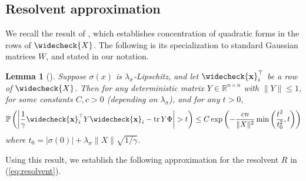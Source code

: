 \documentclass{article}
\newtheorem{lemma}[theorem]{Lemma}
\theoremstyle{definition}
\newcommand{\R}{\mathbb{R}}
\newcommand{\tr}{\operatorname{tr}}
\newcommand{\vX}{\widecheck{X}}
\renewcommand{\P}{\mathbb{P}}
\newcommand{\vx}{\widecheck{\mathbf{x}}}
\newcommand{\1}{\mathbf{1}}
\begin{document}
\subsection{Resolvent approximation}

We recall the result of \cite[Lemma 1]{louart2018random}, which
establishes concentration of quadratic forms in the rows of $\vX$.
The following is its specialization to standard Gaussian matrices $W$,
and stated in our notation.

\begin{lemma}[\cite{louart2018random}]\label{lemma:quadform}
Suppose $\sigma(x)$ is $\lambda_\sigma$-Lipschitz, and let $\vx_i^\top$ be a row
of $\vX$. Then for any deterministic
matrix $Y \in \R^{n\times n}$ with $\|Y\|\le 1$, for some constants
$C,c>0$ (depending on $\lambda_\sigma$), and for any $t>0$,
\begin{equation}\label{eq:concentration_quadratic}
\P\left(\left|\frac{1}{\gamma}\vx_i^\top Y \vx_i-\tr Y\Phi \right|>t\right)
\leq C\exp\left(-\frac{cn}{\|X\|^2}\min\left(\frac{t^2}{t_0^2},
t\right)\right)
\end{equation}
where $t_0=|\sigma(0)|+\lambda_\sigma\|X\|\sqrt{1/\gamma}$.
\end{lemma}

Using this result, we establish the following approximation for the resolvent
$R$ in (\ref{eq:resolvent}).
\end{document}
